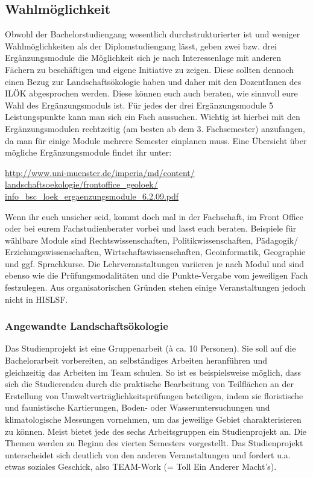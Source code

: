 \subsection*{Wahlmöglichkeit}
Obwohl der Bachelorstudiengang wesentlich durchstrukturierter ist und weniger Wahlmöglichkeiten als der Diplomstudiengang lässt, geben zwei bzw. drei Ergänzungsmodule die Möglichkeit sich je nach Interessenlage mit anderen Fächern zu beschäftigen und eigene Initiative zu zeigen. Diese sollten dennoch einen Bezug zur Landschaftsökologie haben und daher mit den DozentInnen des ILÖK abgesprochen werden. Diese können euch auch beraten, wie sinnvoll eure Wahl des Ergänzungsmoduls ist. Für jedes der drei Ergänzungsmodule \` 5 Leistungspunkte kann man sich ein Fach aussuchen. Wichtig ist hierbei mit den Ergänzungsmodulen rechtzeitig (am besten ab dem 3. Fachsemester) anzufangen, da man für einige Module mehrere Semester einplanen muss. Eine Übersicht über mögliche Ergänzungsmodule ﬁndet ihr unter:

\url{http://www.uni-muenster.de/imperia/md/content/}\\\url{landschaftsoekologie/frontoffice_geoloek/}\\\url{info_bsc_loek_ergaenzungsmodule_6.2.09.pdf}

Wenn ihr euch unsicher seid, kommt doch mal in der Fachschaft, im Front Office oder bei eurem Fachstudienberater vorbei und lasst euch beraten. Beispiele für wählbare Module sind Rechtswissenschaften, Politikwissenschaften, Pädagogik/ Erziehungswissenschaften, Wirtschaftswissenschaften, Geoinformatik, Geographie und ggf. Sprachkurse. Die Lehrveranstaltungen variieren je nach Modul und sind ebenso wie die Prüfungsmodalitäten und die Punkte-Vergabe vom jeweiligen Fach festzulegen. Aus organisatorischen Gründen stehen einige Veranstaltungen jedoch nicht in HISLSF.

\subsubsection*{Angewandte Landschaftsökologie}
Das Studienprojekt ist eine Gruppenarbeit (à ca. 10 Personen). Sie soll auf die Bachelorarbeit vorbereiten, an selbständiges Arbeiten heranführen und gleichzeitig das Arbeiten im Team schulen. So ist es beispielsweise möglich, dass sich die Studierenden durch die praktische Bearbeitung von Teilﬂächen an der Erstellung von Umweltverträglichkeitsprüfungen beteiligen, indem sie ﬂoristische und faunistische Kartierungen, Boden- oder Wasseruntersuchungen und klimatologische Messungen vornehmen, um das jeweilige Gebiet charakterisieren zu können. Meist bietet jede des sechs Arbeitsgruppen ein Studienprojekt an. Die Themen werden zu Beginn des vierten Semesters vorgestellt. Das Studienprojekt unterscheidet sich deutlich von den anderen Veranstaltungen und fordert u.a. etwas soziales Geschick, also TEAM-Work (= Toll Ein Anderer Macht’s).

